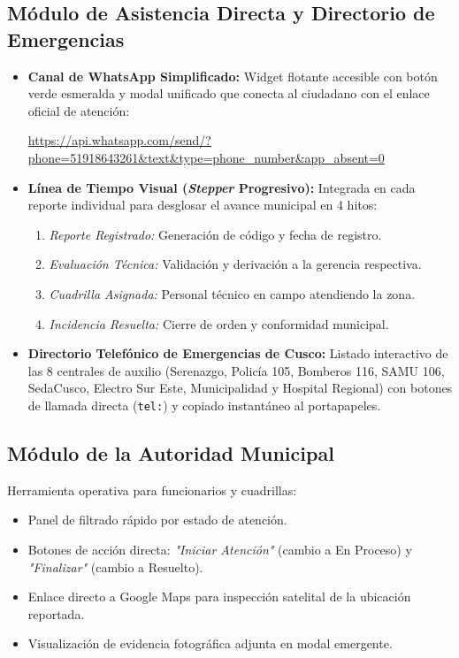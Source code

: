 \documentclass[12pt,a4paper]{article}
\begin{document}
\subsection{Módulo de Asistencia Directa y Directorio de Emergencias}
\begin{itemize}[leftmargin=*]
    \item \textbf{Canal de WhatsApp Simplificado:} Widget flotante accesible con botón verde esmeralda y modal unificado que conecta al ciudadano con el enlace oficial de atención:
    \begin{center}
    \url{https://api.whatsapp.com/send/?phone=51918643261&text&type=phone_number&app_absent=0}
    \end{center}
    \item \textbf{Línea de Tiempo Visual (\textit{Stepper} Progresivo):} Integrada en cada reporte individual para desglosar el avance municipal en 4 hitos:
    \begin{enumerate}
        \item \textit{Reporte Registrado:} Generación de código y fecha de registro.
        \item \textit{Evaluación Técnica:} Validación y derivación a la gerencia respectiva.
        \item \textit{Cuadrilla Asignada:} Personal técnico en campo atendiendo la zona.
        \item \textit{Incidencia Resuelta:} Cierre de orden y conformidad municipal.
    \end{enumerate}
    \item \textbf{Directorio Telefónico de Emergencias de Cusco:} Listado interactivo de las 8 centrales de auxilio (Serenazgo, Policía 105, Bomberos 116, SAMU 106, SedaCusco, Electro Sur Este, Municipalidad y Hospital Regional) con botones de llamada directa (\texttt{tel:}) y copiado instantáneo al portapapeles.
\end{itemize}

\subsection{Módulo de la Autoridad Municipal}
Herramienta operativa para funcionarios y cuadrillas:
\begin{itemize}[leftmargin=*]
    \item Panel de filtrado rápido por estado de atención.
    \item Botones de acción directa: \textit{"Iniciar Atención"} (cambio a En Proceso) y \textit{"Finalizar"} (cambio a Resuelto).
    \item Enlace directo a Google Maps para inspección satelital de la ubicación reportada.
    \item Visualización de evidencia fotográfica adjunta en modal emergente.
\end{itemize}
\end{document}
